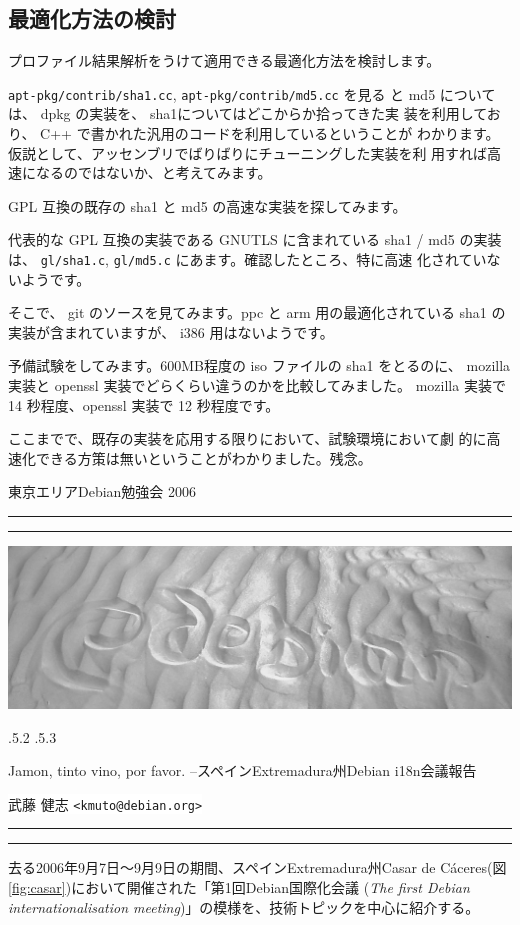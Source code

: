 \documentclass[mingoth,a4paper]{jsarticle}
\makeatletter
\renewcommand{\section}{\@startsection{section}{1}{\z@}%
    {\Cvs \@plus.5\Cdp \@minus.2\Cdp}%
    {.5\Cvs \@plus.3\Cdp}%
    {\normalfont\Huge\headfont\raggedright\centering}} %
\newcommand{\dancersection}[2]{%
\newpage
東京エリアDebian勉強会 2006
\hrule
\vspace{0.5mm}
\hrule
\hfill{}\includegraphics[width=16cm]{image2006-natsu/guruguru-sand-light.png}\\
\vspace{-5cm}
\begin{center}
\section{#1}
\end{center}
\hfill{}\colorbox{white}{#2}\hspace{3cm}\space\\
\vspace{1cm}
\hrule
\vspace{0.5mm}
\hrule
\vspace{1cm}
}
\makeatother
\begin{document}
\subsection*{最適化方法の検討}

プロファイル結果解析をうけて適用できる最適化方法を検討します。

\texttt{apt-pkg/contrib/sha1.cc}, \texttt{apt-pkg/contrib/md5.cc} を見る
と md5 については、 dpkg の実装を、 sha1についてはどこからか拾ってきた実
装を利用しており、 C++ で書かれた汎用のコードを利用しているということが
わかります。仮説として、アッセンブリでばりばりにチューニングした実装を利
用すれば高速になるのではないか、と考えてみます。

GPL 互換の既存の sha1 と md5 の高速な実装を探してみます。

代表的な GPL 互換の実装である GNUTLS に含まれている sha1 / md5 の実装は、 
\texttt{gl/sha1.c}, \texttt{gl/md5.c} にあます。確認したところ、特に高速
化されていないようです。

そこで、 git のソースを見てみます。ppc と arm 用の最適化されている sha1 
の実装が含まれていますが、 i386 用はないようです。

予備試験をしてみます。600MB程度の iso ファイルの sha1 をとるのに、
mozilla 実装と openssl 実装でどらくらい違うのかを比較してみました。
mozilla 実装で 14 秒程度、openssl 実装で 12 秒程度です。

ここまでで、既存の実装を応用する限りにおいて、試験環境において劇
的に高速化できる方策は無いということがわかりました。残念。


\dancersection{Jamon, tinto vino, por favor. --スペインExtremadura州Debian i18n会議報告}{武藤 健志 \texttt{<kmuto@debian.org>}}
\label{sec:extremadura}

去る2006年9月7日〜9月9日の期間、スペインExtremadura州Casar de C\'{a}ceres(図\ref{fig:casar})において開催された「第1回Debian国際化会議 (\emph{The first Debian internationalisation meeting})」の模様を、技術トピックを中心に紹介する。
\end{document}
